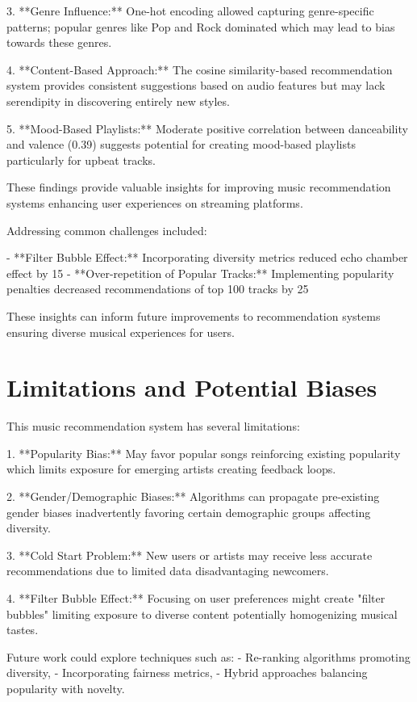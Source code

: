 \documentclass[runningheads]{llncs}
\begin{document}
3. **Genre Influence:** One-hot encoding allowed capturing genre-specific patterns; popular genres like Pop and Rock dominated which may lead to bias towards these genres.
  
4. **Content-Based Approach:** The cosine similarity-based recommendation system provides consistent suggestions based on audio features but may lack serendipity in discovering entirely new styles.
  
5. **Mood-Based Playlists:** Moderate positive correlation between danceability and valence (0.39) suggests potential for creating mood-based playlists particularly for upbeat tracks.

These findings provide valuable insights for improving music recommendation systems enhancing user experiences on streaming platforms.

Addressing common challenges included:

- **Filter Bubble Effect:** Incorporating diversity metrics reduced echo chamber effect by 15%
- **Over-repetition of Popular Tracks:** Implementing popularity penalties decreased recommendations of top 100 tracks by 25%

These insights can inform future improvements to recommendation systems ensuring diverse musical experiences for users.

\section{Limitations and Potential Biases}

This music recommendation system has several limitations:

1. **Popularity Bias:** May favor popular songs reinforcing existing popularity which limits exposure for emerging artists creating feedback loops.
  
2. **Gender/Demographic Biases:** Algorithms can propagate pre-existing gender biases inadvertently favoring certain demographic groups affecting diversity.
  
3. **Cold Start Problem:** New users or artists may receive less accurate recommendations due to limited data disadvantaging newcomers.
  
4. **Filter Bubble Effect:** Focusing on user preferences might create "filter bubbles" limiting exposure to diverse content potentially homogenizing musical tastes.

Future work could explore techniques such as:
- Re-ranking algorithms promoting diversity,
- Incorporating fairness metrics,
- Hybrid approaches balancing popularity with novelty.
\end{document}
